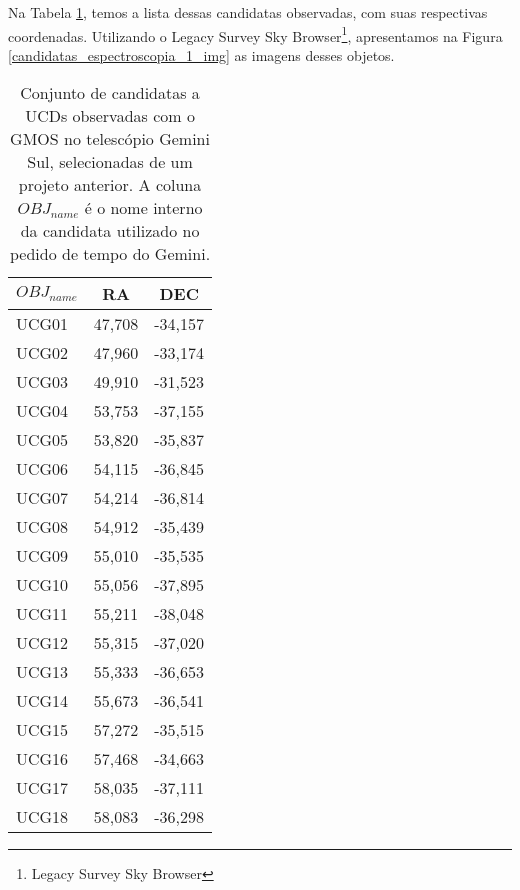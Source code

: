 Na Tabela \ref{candidatas_espectroscopia_1}, temos a lista dessas candidatas observadas, com suas respectivas coordenadas. Utilizando o Legacy Survey Sky Browser\footnote{Legacy Survey Sky Browser}, apresentamos na Figura \ref{candidatas_espectroscopia_1_img} as imagens desses objetos.

\begin{table}[!ht]
    \centering
    \caption{Conjunto de candidatas a UCDs observadas com o GMOS no telescópio Gemini Sul, selecionadas de um projeto anterior. A coluna $OBJ_{name}$ é o nome interno da candidata utilizado no pedido de tempo do Gemini.} 
    \begin{tabular}{lcc}
        \toprule
        $OBJ_{name}$ & RA     & DEC     \\
        \midrule
        UCG01     & 47,708 & -34,157 \\
        UCG02     & 47,960 & -33,174 \\
        UCG03     & 49,910 & -31,523 \\
        UCG04     & 53,753 & -37,155 \\
        UCG05     & 53,820 & -35,837 \\
        UCG06     & 54,115 & -36,845 \\
        UCG07     & 54,214 & -36,814 \\
        UCG08     & 54,912 & -35,439 \\
        UCG09     & 55,010 & -35,535 \\
        UCG10     & 55,056 & -37,895 \\
        UCG11     & 55,211 & -38,048 \\
        UCG12     & 55,315 & -37,020 \\
        UCG13     & 55,333 & -36,653 \\
        UCG14     & 55,673 & -36,541 \\
        UCG15     & 57,272 & -35,515 \\
        UCG16     & 57,468 & -34,663 \\
        UCG17     & 58,035 & -37,111 \\
        UCG18     & 58,083 & -36,298 \\
        \bottomrule
    \end{tabular}
    \label{candidatas_espectroscopia_1}
\end{table}


